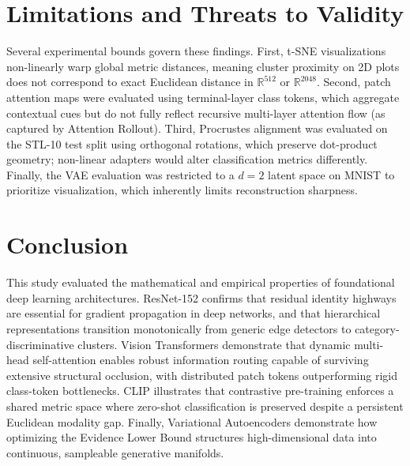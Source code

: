 \documentclass{article}
\begin{document}
    \section{Limitations and Threats to Validity}
    Several experimental bounds govern these findings. First, t-SNE visualizations non-linearly warp global metric distances, meaning cluster proximity on 2D plots does not correspond to exact Euclidean distance in $\mathbb{R}^{512}$ or $\mathbb{R}^{2048}$. Second, patch attention maps were evaluated using terminal-layer class tokens, which aggregate contextual cues but do not fully reflect recursive multi-layer attention flow (as captured by Attention Rollout). Third, Procrustes alignment was evaluated on the STL-10 test split using orthogonal rotations, which preserve dot-product geometry; non-linear adapters would alter classification metrics differently. Finally, the VAE evaluation was restricted to a $d=2$ latent space on MNIST to prioritize visualization, which inherently limits reconstruction sharpness.
    
    \section{Conclusion}
    This study evaluated the mathematical and empirical properties of foundational deep learning architectures. ResNet-152 confirms that residual identity highways are essential for gradient propagation in deep networks, and that hierarchical representations transition monotonically from generic edge detectors to category-discriminative clusters. Vision Transformers demonstrate that dynamic multi-head self-attention enables robust information routing capable of surviving extensive structural occlusion, with distributed patch tokens outperforming rigid class-token bottlenecks. CLIP illustrates that contrastive pre-training enforces a shared metric space where zero-shot classification is preserved despite a persistent Euclidean modality gap. Finally, Variational Autoencoders demonstrate how optimizing the Evidence Lower Bound structures high-dimensional data into continuous, sampleable generative manifolds.
    
    
\end{document}
